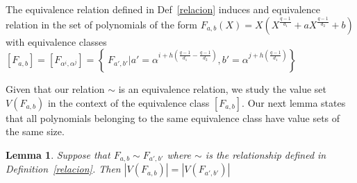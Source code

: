 \documentclass{article}
\newtheorem{lemma}[theorem]{Lemma}
\theoremstyle{definition}
\theoremstyle{remark}
\numberwithin{equation}{section}
\begin{document}
The equivalence relation defined in Def~\ref{relacion} induces and equivalence relation in the set of polynomials of the form $F_{a,b}(X) = X(X^{\frac{q-1}{d_1}} + aX^{\frac{q-1}{d_2}} +b)$ with equivalence classes $[F_{a,b}] = [F_{\alpha^i, \alpha^j}] = \left\{\ F_{a',b'} | a' = \alpha^{i+h(\frac{q-1}{d_1} - \frac{q-1}{d_2})}, b' = \alpha^{j+h(\frac{q-1}{d_1})} \right\}$

Given that our relation $\sim$ is an equivalence relation, we study the value set $V(F_{a,b})$ in the context of the equivalence class $[F_{a,b}]$. Our next lemma states that all polynomials belonging to the same equivalence class have value sets of the same size. 

\begin{lemma}
  
  Suppose that $F_{a,b} \sim F_{a',b'}$ where $\sim$ is the relationship defined in Definition~\ref{relacion}. Then $|V(F_{a,b})| = |V(F_{a',b'})|$

\end{lemma}
\end{document}
